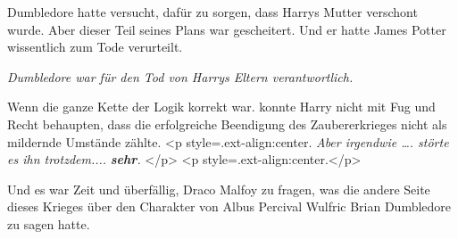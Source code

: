 Dumbledore hatte versucht, dafür zu sorgen, dass Harrys Mutter verschont wurde.
Aber dieser Teil seines Plans war gescheitert. Und er hatte James Potter
wissentlich zum Tode verurteilt.

\emph{Dumbledore war für den Tod von Harrys Eltern verantwortlich.}

Wenn die ganze Kette der Logik korrekt war. konnte Harry nicht mit Fug und Recht
behaupten, dass die erfolgreiche Beendigung des Zaubererkrieges nicht als
mildernde Umstände zählte. <p style=\grqq{}.ext-align:center\grqq{}. \emph{ Aber
irgendwie …. störte es ihn trotzdem....} \textbf{\emph{sehr}}\emph{.} </p> <p
style=\grqq{}.ext-align:center\grqq{}.</p>

Und es war Zeit und überfällig, Draco Malfoy zu fragen, was die andere Seite
dieses Krieges über den Charakter von Albus Percival Wulfric Brian Dumbledore zu
sagen hatte.

